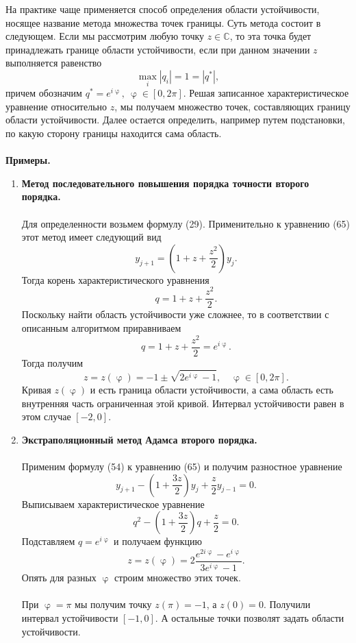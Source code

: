 \documentclass[a4paper, 12pt]{report}
\numberwithin{equation}{section}
\newcommand{\Cm}{\mathbb{C}}
\renewcommand{\varphi}{\upvarphi}
\begin{document}
	 На практике чаще применяется способ определения области устойчивости, носящее название метода множества точек границы. Суть метода состоит в следующем. Если мы рассмотрим любую точку $z \in \Cm$, то эта точка будет принадлежать границе области устойчивости, если при данном значении $z$ выполняется равенство $$\underset{i}{\max}|q_i| = 1 = |q^*|,$$
	 причем обозначим $q^* = e^{i\varphi},\ \varphi \in [0, 2\pi].$ Решая записанное характеристическое уравнение относительно $z$, мы получаем множество точек, составляющих границу области устойчивости. Далее остается определить, например путем подстановки, по какую сторону границы находится сама область.\\\\
	 \textbf{Примеры.}
	 \begin{enumerate}
	 	\item \textbf{Метод последовательного повышения порядка точности второго порядка.}\\\\
	 	Для определенности возьмем формулу (29). Применительно к уравнению (65) этот метод имеет следующий вид $$y_{j+1} = \left(1+z + \dfrac {z^2}{2}\right)y_j.$$
	 	Тогда корень характеристического уравнения $$q = 1 + z + \dfrac{z^2}{2}.$$
	 	Поскольку найти область устойчивости уже сложнее, то в соответствии с описанным алгоритмом приравниваем $$q = 1 + z + \dfrac{z^2}{2} = e^{i\varphi}.$$
	 	Тогда получим $$z = z(\varphi) = - 1 \pm \sqrt {2e^{i\varphi}-1},\quad\varphi \in [0,2\pi].$$
	 	Кривая $z(\varphi)$ и есть граница области устойчивости, а сама область есть внутренняя часть ограниченная этой кривой. Интервал устойчивости равен в этом случае $[-2, 0]$.
	 	\item \textbf{Экстраполяционный метод Адамса второго порядка.}\\\\
	 	Применим формулу (54) к уравнению (65) и получим разностное уравнение $$y_{j+1}  - \left(1 + \dfrac{3z}{2}\right)y_j + \dfrac z 2 y_{j-1} = 0.$$
	 	Выписываем характеристическое уравнение $$q^2  - \left(1 + \dfrac{3z}{2}\right)q + \dfrac z 2  = 0.$$
	 	Подставляем $q = e^{i\varphi}$ и получаем функцию $$z = z(\varphi) = 2 \dfrac{e^{2i\varphi} - e^{i\varphi}}{3 e^{i\varphi} - 1}.$$
	 	Опять для разных $\varphi$ строим множество этих точек. \\\\
	 	При $\varphi = \pi$ мы получим точку $z(\pi) = -1$, а $z(0) = 0$. Получили интервал устойчивости $[-1, 0]$. А остальные точки позволят задать области устойчивости.  
	 \end{enumerate}
\end{document}
